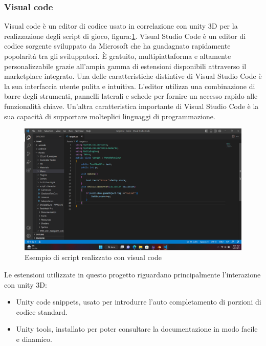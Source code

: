 \documentclass[
a4paper,
cleardoublepage=empty,
headings=twolinechapter,
numbers=autoenddot,
]{scrbook}
\begin{document}
    \subsubsection{Visual code}
    Visual code è un editor di codice usato in correlazione con unity 3D per la realizzazione degli script di gioco, figura:\ref{fig:visual_code}.
    Visual Studio Code è un editor di codice sorgente sviluppato da Microsoft che ha guadagnato rapidamente popolarità tra gli sviluppatori. È gratuito, multipiattaforma e altamente personalizzabile grazie all'ampia gamma di estensioni disponibili attraverso il marketplace integrato.
    Una delle caratteristiche distintive di Visual Studio Code è la sua interfaccia utente pulita e intuitiva. L'editor utilizza una combinazione di barre degli strumenti, pannelli laterali e schede per fornire un accesso rapido alle funzionalità chiave.
    Un'altra caratteristica importante di Visual Studio Code è la sua capacità di supportare molteplici linguaggi di programmazione.
    \begin{figure}[H]
    	\centering
    	\includegraphics[width=0.8\linewidth]{image/visual_code}
    	\caption{Esempio di script realizzato con visual code}
    	\label{fig:visual_code}
    \end{figure}
    Le estensioni utilizzate in questo progetto riguardano principalmente l'interazione con unity 3D:
    \begin{itemize}
    	\item Unity code snippets\cite{code-snippets}, usato per introdurre l'auto completamento di porzioni di codice standard.
    	\item Unity tools\cite{UnityTools}, installato per poter consultare la documentazione in modo facile e dinamico. 
    \end{itemize}
\end{document}
